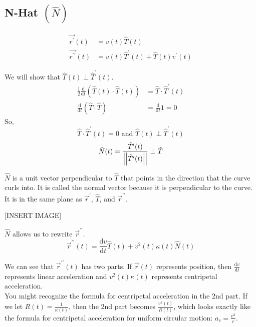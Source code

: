 \subsection{N-Hat $\left(\hat{N}\right)$}
\noindent
\begin{align*}
	\vec{r^{\prime}}(t) &= v(t)\hat{T}(t) \\
	\vec{r^{\prime\prime}}(t) &= v(t)\hat{T}^{\prime}(t)+\hat{T}(t)v^{\prime}(t)
\end{align*}

\noindent
We will show that $\hat{T}(t) \perp \hat{T}^{\prime}(t)$.
\begin{align*}
	\frac{1}{2}\frac{\mathrm{d}}{\mathrm{d}t}\left(\hat{T}(t)\cdot\hat{T}(t)\right) &= \hat{T}\cdot\hat{T}^{\prime}(t) \\
	\frac{\mathrm{d}}{\mathrm{d}t}\left(\hat{T}\cdot\hat{T}\right) &= \frac{\mathrm{d}}{\mathrm{d}t}1 = 0
\end{align*}
So, 
\begin{equation*}
	\hat{T}\cdot\hat{T}^{\prime}(t) = 0 \text{ and } \hat{T}(t) \perp \hat{T}^{\prime}(t)
\end{equation*}
\begin{equation*}
	\hat{N}(t)=\frac{\hat{T}^{\prime}(t)}{\left|\left|\hat{T}^{\prime}(t)\right|\right|}\perp\hat{T}
\end{equation*}

\noindent
$\hat{N}$ is a unit vector perpendicular to $\hat{T}$ that points in the direction that the curve curls into. It is called the normal vector because it is perpendicular to the curve. It is in the same plane as $\vec{r}^\prime$, $\hat{T}$, and  $\vec{r}^{\prime\prime}$.

[INSERT IMAGE]

\noindent
$\hat{N}$ allows us to rewrite $\vec{r}^{\prime\prime}$.\\
\begin{equation*}
	\vec{r}^{\prime\prime}(t)=\frac{\mathrm{d}v}{\mathrm{d}t}\hat{T}(t)+v^{2}(t)\kappa(t)\hat{N}(t)
\end{equation*}

\noindent
We can see that $\vec{r}^{\prime\prime}(t)$ has two parts. If $\vec{r}(t)$ represents position, then $\frac{\mathrm{d}v}{\mathrm{d}t}$ represents linear acceleration and $v^2(t)\kappa(t)$ represents centripetal acceleration.\\ 
You might recognize the formula for centripetal acceleration in the 2nd part. If we let $R(t) = \frac{1}{\kappa(t)}$, then the 2nd part becomes $\frac{v^2(t)}{R(t)}$, which looks exactly like the formula for centripetal acceleration for uniform circular motion: $a_c = \frac{v^2}{r}$.